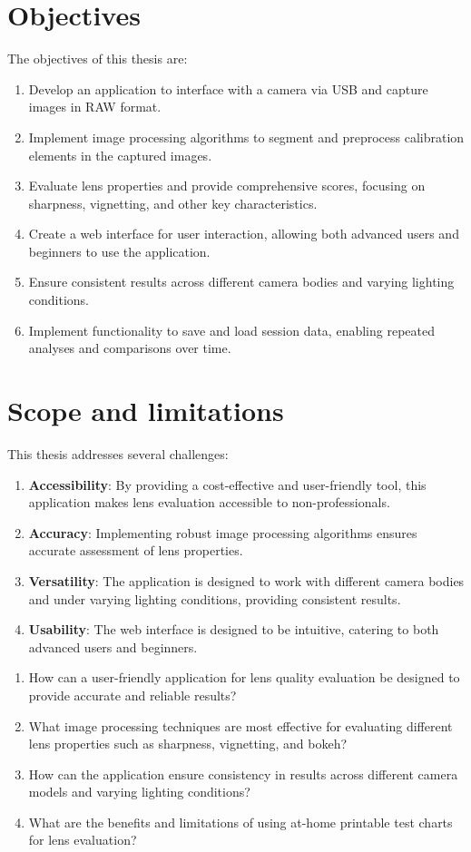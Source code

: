 \section*{Objectives}
The objectives of this thesis are:
\begin{enumerate}
    \item Develop an application to interface with a camera via USB and capture images in RAW format.
    \item Implement image processing algorithms to segment and preprocess calibration elements in the captured images.
    \item Evaluate lens properties and provide comprehensive scores, focusing on sharpness, vignetting, and other key characteristics.
    \item Create a web interface for user interaction, allowing both advanced users and beginners to use the application.
    \item Ensure consistent results across different camera bodies and varying lighting conditions.
    \item Implement functionality to save and load session data, enabling repeated analyses and comparisons over time.
\end{enumerate}

\section*{Scope and limitations}

This thesis addresses several challenges:
\begin{enumerate}
    \item \textbf{Accessibility}: By providing a cost-effective and user-friendly tool, this application makes lens evaluation accessible to non-professionals.
    \item \textbf{Accuracy}: Implementing robust image processing algorithms ensures accurate assessment of lens properties.
    \item \textbf{Versatility}: The application is designed to work with different camera bodies and under varying lighting conditions, providing consistent results.
    \item \textbf{Usability}: The web interface is designed to be intuitive, catering to both advanced users and beginners.
\end{enumerate}
\begin{enumerate}
    \item How can a user-friendly application for lens quality evaluation be designed to provide accurate and reliable results?
    \item What image processing techniques are most effective for evaluating different lens properties such as sharpness, vignetting, and bokeh?
    \item How can the application ensure consistency in results across different camera models and varying lighting conditions?
    \item What are the benefits and limitations of using at-home printable test charts for lens evaluation?
\end{enumerate}

